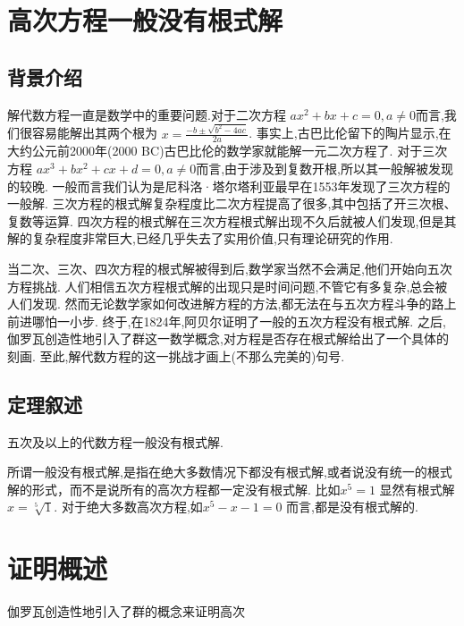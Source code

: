 \documentclass[main]{subfiles}
\begin{document}
\renewcommand{\filename}{No.9Theorem}%
\section{高次方程一般没有根式解}
\subsection{背景介绍}
解代数方程一直是数学中的重要问题.对于二次方程 \(ax^2+bx+c=0,a \neq 0\)而言,我们很容易能解出其两个根为 \(x= \frac{-b \pm \sqrt{b^2-4ac}}{2a}\).
事实上,古巴比伦留下的陶片显示,在大约公元前2000年(2000 BC)古巴比伦的数学家就能解一元二次方程了.
对于三次方程 \(ax^3+bx^2+cx+d=0,a \neq 0\)而言,由于涉及到复数开根,所以其一般解被发现的较晚.
一般而言我们认为是尼科洛·塔尔塔利亚最早在1553年发现了三次方程的一般解.
三次方程的根式解复杂程度比二次方程提高了很多,其中包括了开三次根、复数等运算.
四次方程的根式解在三次方程根式解出现不久后就被人们发现,但是其解的复杂程度非常巨大,已经几乎失去了实用价值,只有理论研究的作用.

当二次、三次、四次方程的根式解被得到后,数学家当然不会满足,他们开始向五次方程挑战.
人们相信五次方程根式解的出现只是时间问题,不管它有多复杂,总会被人们发现.
然而无论数学家如何改进解方程的方法,都无法在与五次方程斗争的路上前进哪怕一小步.
终于,在1824年,阿贝尔证明了一般的五次方程没有根式解.
之后,伽罗瓦创造性地引入了群这一数学概念,对方程是否存在根式解给出了一个具体的刻画.
至此,解代数方程的这一挑战才画上(不那么完美的)句号.
\subsection{定理叙述}
\begin{theorem}\label{the:1}
  五次及以上的代数方程一般没有根式解.
\end{theorem}
所谓一般没有根式解,是指在绝大多数情况下都没有根式解,或者说没有统一的根式解的形式，而不是说所有的高次方程都一定没有根式解.
比如\(x^5=1\) 显然有根式解\(x=\sqrt[5]{1}\).
对于绝大多数高次方程,如\(x^5-x-1=0\) 而言,都是没有根式解的.
\section{证明概述}
伽罗瓦创造性地引入了群的概念来证明高次
\end{document}
